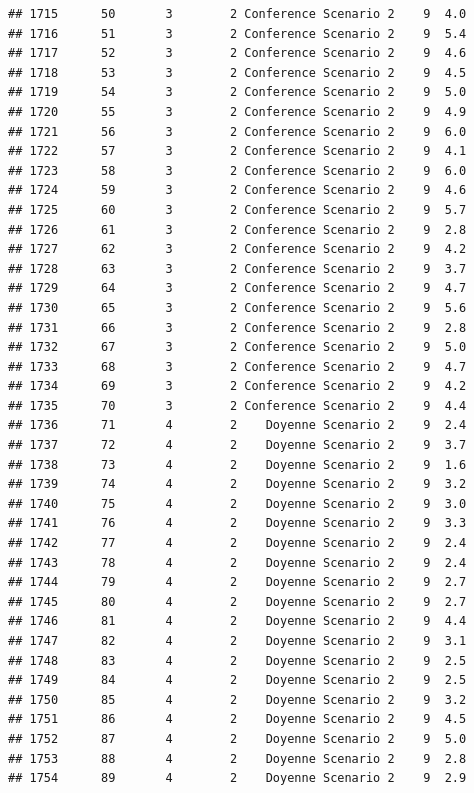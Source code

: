 \documentclass[
]{article}
\begin{document}
\begin{verbatim}
## 1715      50       3        2 Conference Scenario 2    9  4.0
## 1716      51       3        2 Conference Scenario 2    9  5.4
## 1717      52       3        2 Conference Scenario 2    9  4.6
## 1718      53       3        2 Conference Scenario 2    9  4.5
## 1719      54       3        2 Conference Scenario 2    9  5.0
## 1720      55       3        2 Conference Scenario 2    9  4.9
## 1721      56       3        2 Conference Scenario 2    9  6.0
## 1722      57       3        2 Conference Scenario 2    9  4.1
## 1723      58       3        2 Conference Scenario 2    9  6.0
## 1724      59       3        2 Conference Scenario 2    9  4.6
## 1725      60       3        2 Conference Scenario 2    9  5.7
## 1726      61       3        2 Conference Scenario 2    9  2.8
## 1727      62       3        2 Conference Scenario 2    9  4.2
## 1728      63       3        2 Conference Scenario 2    9  3.7
## 1729      64       3        2 Conference Scenario 2    9  4.7
## 1730      65       3        2 Conference Scenario 2    9  5.6
## 1731      66       3        2 Conference Scenario 2    9  2.8
## 1732      67       3        2 Conference Scenario 2    9  5.0
## 1733      68       3        2 Conference Scenario 2    9  4.7
## 1734      69       3        2 Conference Scenario 2    9  4.2
## 1735      70       3        2 Conference Scenario 2    9  4.4
## 1736      71       4        2    Doyenne Scenario 2    9  2.4
## 1737      72       4        2    Doyenne Scenario 2    9  3.7
## 1738      73       4        2    Doyenne Scenario 2    9  1.6
## 1739      74       4        2    Doyenne Scenario 2    9  3.2
## 1740      75       4        2    Doyenne Scenario 2    9  3.0
## 1741      76       4        2    Doyenne Scenario 2    9  3.3
## 1742      77       4        2    Doyenne Scenario 2    9  2.4
## 1743      78       4        2    Doyenne Scenario 2    9  2.4
## 1744      79       4        2    Doyenne Scenario 2    9  2.7
## 1745      80       4        2    Doyenne Scenario 2    9  2.7
## 1746      81       4        2    Doyenne Scenario 2    9  4.4
## 1747      82       4        2    Doyenne Scenario 2    9  3.1
## 1748      83       4        2    Doyenne Scenario 2    9  2.5
## 1749      84       4        2    Doyenne Scenario 2    9  2.5
## 1750      85       4        2    Doyenne Scenario 2    9  3.2
## 1751      86       4        2    Doyenne Scenario 2    9  4.5
## 1752      87       4        2    Doyenne Scenario 2    9  5.0
## 1753      88       4        2    Doyenne Scenario 2    9  2.8
## 1754      89       4        2    Doyenne Scenario 2    9  2.9

\end{verbatim}
\end{document}
